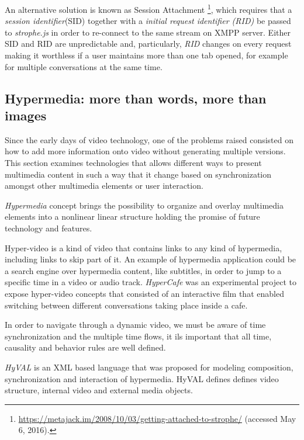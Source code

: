 \documentclass[conference,compsoc,a4paper]{IEEEtran}
\begin{document}
    An alternative solution is known as Session Attachment \footnote{\url{https://metajack.im/2008/10/03/getting-attached-to-strophe/} (accessed May 6, 2016).}, which requires that a \textit{session identifier}(SID) together with a \textit{initial request identifier (RID)} be passed to \emph{strophe.js} in order to re-connect to the same stream on \gls{XMPP} server. Either SID and RID are unpredictable and, particularly, \textit{RID} changes on every request making it worthless if a user maintains more than one tab opened, for example for multiple conversations at the same time.
    

\subsection{Hypermedia: more than words, more than images}
\label{hypermedia}

Since the early days of video technology, one of the problems raised consisted on how to add more information onto video without generating multiple versions. This section examines technologies that allows different ways to present multimedia content in such a way that it change based on synchronization amongst other multimedia elements or user interaction.

\emph{Hypermedia} concept brings the possibility to organize and overlay multimedia elements into a nonlinear linear structure holding the promise of future technology and features.

  
 

  Hyper-video is a kind of video that contains links to any kind of hypermedia, including links to skip part of it. An example of hypermedia application could be a search engine over hypermedia content, like subtitles, in order to jump to a specific time in a video or audio track. \emph{HyperCafe} \cite{hypercafe} was an experimental project to expose hyper-video concepts that consisted of an interactive film that enabled switching between different conversations taking place inside a cafe.
 

  In order to navigate through a dynamic video, we must be aware of time synchronization and the multiple time flows, it ils important that all time, causality and behavior rules are well defined.
  
  
  \emph{HyVAL}\cite{hyval} is an \gls{XML} based language that was proposed for modeling composition, synchronization and interaction of hypermedia. HyVAL defines defines video structure, internal video and external media objects. 
\end{document}
